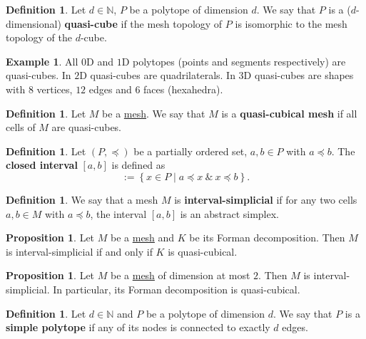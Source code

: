 \documentclass[fleqn]{article}
\theoremstyle{definition}
\newtheorem{proposition}[theorem]{Proposition}
\newtheorem{definition}[theorem]{Definition}
\newtheorem{example}[theorem]{Example}
\newcommand{\N}{\mathbb{N}}
\newcommand{\set}[2]{\left\{ #1 \mid #2 \right\}}
\begin{document}
\begin{definition}
  Let $d \in \N$, $P$ be a polytope of dimension $d$.
  We say that $P$ is a ($d$-dimensional) \textbf{quasi-cube} if the mesh
  topology of $P$ is isomorphic to the mesh topology of the $d$-cube.
\end{definition}

\begin{example}
  All $0$D and $1$D polytopes (points and segments respectively)
  are quasi-cubes.
  In $2$D quasi-cubes are quadrilaterals.
  In $3$D quasi-cubes are shapes
  with $8$ vertices, $12$ edges and $6$ faces (hexahedra).
\end{example}

\begin{definition}
  Let $M$ be a \hyperref[idec:mesh:definition]{mesh}.
  We say that $M$ is a \textbf{quasi-cubical mesh}
  if all cells of $M$ are quasi-cubes.
\end{definition}

\begin{definition}
  Let
    $(P, \preceq)$ be a partially ordered set,
    $a, b \in P$ with $a \preceq b$.
  The \textbf{closed interval} $[a, b]$ is defined as
  \begin{equation}
    [a, b] := \set{x \in P}{a \preceq x\ \&\ x \preceq b}.
  \end{equation}
\end{definition}

\begin{definition}
  We say that a mesh $M$ is \textbf{interval-simplicial} if for any two cells
  $a, b \in M$ with $a \preceq b$, the interval $[a, b]$ is an abstract simplex.
\end{definition}

\begin{proposition}
  Let
    $M$ be a \hyperref[idec:mesh:definition]{mesh}
    and $K$ be its Forman decomposition.
  Then $M$ is interval-simplicial if and only if $K$ is quasi-cubical.
\end{proposition}

\begin{proposition}
  Let $M$ be a \hyperref[idec:mesh:definition]{mesh} of dimension at most $2$.
  Then $M$ is interval-simplicial.
  In particular, its Forman decomposition is quasi-cubical.
\end{proposition}

\begin{definition}
  Let $d \in \N$ and $P$ be a polytope of dimension $d$.
  We say that $P$ is a \textbf{simple polytope}
  if any of its nodes is connected to exactly $d$ edges.
\end{definition}
\end{document}
